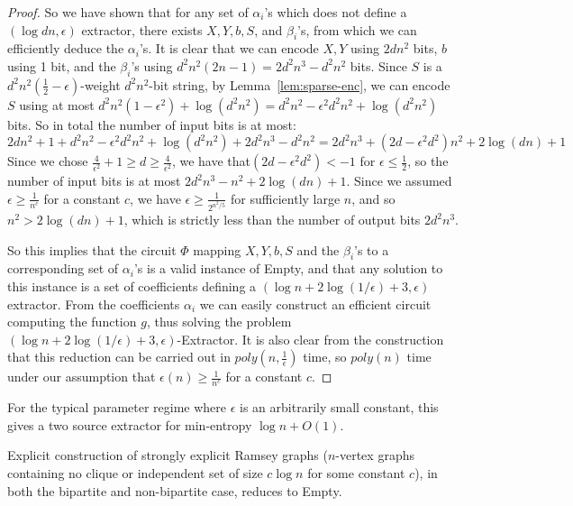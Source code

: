 \begin{proof}
So we have shown that for any set of $\alpha_i$'s which does not define a $(\log dn, \epsilon)$ extractor, there exists $X,Y,b,S$, and $\beta_i$'s, from which we can efficiently deduce the $\alpha_i$'s. It is clear that we can encode $X,Y$ using $2dn^2$ bits, $b$ using 1 bit, and the $\beta_i$'s using $d^2n^2(2n-1) = 2d^2n^3 - d^2n^2$ bits. Since $S$ is a $d^2n^2(\frac{1}{2} - \epsilon)$-weight $d^2n^2$-bit string, by Lemma~\ref{lem:sparse-enc}, we can encode $S$ using at most $d^2n^2(1 - \epsilon^2) + \log(d^2n^2) = d^2n^2 - \epsilon^2d^2n^2 + \log(d^2n^2)$ bits. So in total the number of input bits is at most:
\[
2dn^2 + 1 + d^2n^2 - \epsilon^2d^2n^2 + \log(d^2n^2) + 2d^2n^3 - d^2n^2 = 2d^2n^3 + (2d-\epsilon^2d^2)n^2 + 2\log(dn) + 1
\]
Since we chose $\frac{4}{\epsilon^2} + 1 \geq d \geq \frac{4}{\epsilon^2}$, we have that$(2d - \epsilon^2d^2) < -1$ for $\epsilon \leq \frac{1}{2}$, so the number of input bits is at most $2d^2n^3 - n^2 + 2\log(dn) + 1$. Since we assumed $\epsilon \geq \frac{1}{n^c}$ for a constant $c$, we have $\epsilon \geq \frac{1}{2^{n^2/5}}$ for sufficiently large $n$, and so $n^2 > 2\log(dn) + 1$, which is strictly less than the number of output bits $2d^2n^3$.

So this implies that the circuit $\Phi$ mapping $X,Y,b,S$ and the $\beta_i$'s to a corresponding set of $\alpha_i$'s is a valid instance of {\sc Empty}, and that any solution to this instance is a set of coefficients defining a $(\log n + 2\log(1/\epsilon) + 3, \epsilon)$ extractor. From the coefficients $\alpha_i$ we can easily construct an efficient circuit computing the function $g   $, thus solving the problem {\sc $(\log n + 2\log(1/\epsilon) + 3, \epsilon)$-Extractor}. It is also clear from the construction that this reduction can be carried out in $poly(n, \frac{1}{\epsilon})$ time, so $poly(n)$ time under our assumption that $\epsilon(n) \geq \frac{1}{n^c}$ for a constant $c$.
\end{proof}

For the typical parameter regime where $\epsilon$ is an arbitrarily small constant, this gives a two source extractor for min-entropy $\log n + O(1)$.

\begin{corollary}
Explicit construction of strongly explicit Ramsey graphs ($n$-vertex graphs containing no clique or independent set of size $c\log n$ for some constant $c$), in both the bipartite and non-bipartite case, reduces to {\sc Empty}.
\end{corollary}

